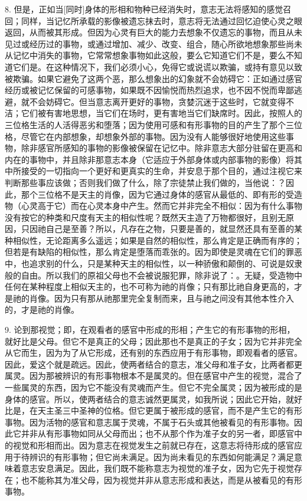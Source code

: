 8. 但是，正如当[同时]身体的形相和物种已经消失时，意志无法将感知的感觉召回；同样，当记忆所承载的影像被遗忘抹去时，意志将无法通过回忆迫使心灵之眼返回，从而被其形成。但因为心灵有巨大的能力去想象不仅遗忘的事物，而且从未见过或经历过的事物，或通过增加、减少、改变、组合，随心所欲地想象那些尚未从记忆中消失的事物，它常常想象事物如此这般，要么它知道它们不是，要么不知道它们是。在这种情况下，我们必须小心，免得它或说谎以欺骗，或持有意见以致被欺骗。如果它避免了这两个恶，那么想象出的幻象就不会妨碍它：正如通过感官经历或被记忆保留的可感事物，如果既不因愉悦而热烈追求，也不因不悦而卑鄙逃避，就不会妨碍它。但当意志离开更好的事物，贪婪沉迷于这些时，它就变得不洁；它们被有害地思想，当它们在场时，更有害地当它们缺席时。因此，按照人的三位格生活的人活得恶劣和堕落；因为使用可感和有形事物的目的产生了那个三位格，尽管它在内部想象，却想象外部的事物。因为没有人能够很好地使用这些事物，除非感官所感知的事物的影像被保留在记忆中。除非意志大部分驻留在更高和内在的事物中，并且除非那意志本身（它适应于外部身体或内部事物的影像）将其中所接受的一切指向一个更好和更真实的生命，并安息于那个目的，通过注视它来判断那些事应该做；否则我们做了什么，除了宗徒禁止我们做的，当他说：？因此，那个三位格不是天主的肖像，因为它通过身体的感官从最低的、即有形的受造物（心灵高于它）而在心灵本身中产生。然而它并非完全不相似：因为有什么事物没有按它的种类和尺度有天主的相似性呢？既然天主造了万物都很好，且别无原因，只因祂自己是至善？所以，凡存在之物，只要是善的，就显然还具有至善的某种相似性，无论距离多么遥远；如果是自然的相似性，那么肯定是正确而有序的；但若是有缺陷的相似性，那么肯定是堕落而乖张的。因为即使是灵魂在它们的罪恶中，也追求别的什么，只是某种天主的相似性，以一种骄傲和颠倒的、可说是奴隶般的自由。所以我们的原祖父母也不会被说服犯罪，除非说了：。无疑，受造物中任何在某种程度上相似天主的，也不可称为祂的肖像；只有那比祂自身更高的，才是祂的肖像。因为只有那从祂那里完全复制而来，且与祂之间没有其他本性介入的，才是祂的肖像。\par

9. 论到那视觉；即，在观看者的感官中形成的形相；产生它的有形事物的形相，就好比是父母。但它不是真正的父母；因此那也不是真正的子女；因为它并非完全从它而生，因为为了从它形成，还有别的东西应用于有形事物，即观看者的感官。因此，爱这个就是疏远。因此，使两者结合的意志，准父母和准子女，比两者都更属灵。因为那被辨识的有形事物根本不是属灵的。但在感官中产生的视觉，混合了一些属灵的东西，因为它不能没有灵魂而产生。但它不完全属灵；因为被形成的是身体的感官。所以，使两者结合的意志诚然更属灵，如我所说；因此它开始，就好比是，在天主圣三中圣神的位格。但它更属于被形成的感官，而不是产生它的有形事物。因为活物的感官和意志属于灵魂，不属于石头或其他被看见的有形事物。因此它并非从有形事物如同从父母而出；也不从那个作为准子女的另一者，即感官中的视觉和形相而出。因为意志在视觉发生之前就已存在，这意志将待形成的感官应用于待辨识的有形事物；但它尚未满足。因为尚未看见的东西如何能满足？满足意味着意志安息满足。因此，我们既不能称意志为视觉的准子女，因为它先于视觉存在；也不能称其为准父母，因为视觉并非从意志形成和表达，而是从被看见的有形事物。\par

